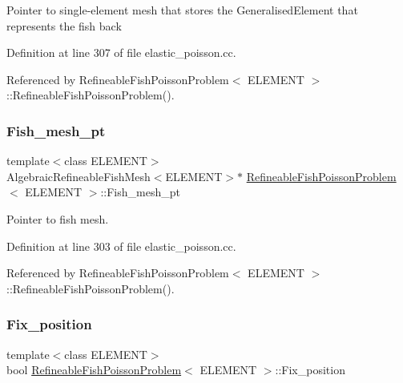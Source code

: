 Pointer to single-\/element mesh that stores the Generalised\+Element that represents the fish back 

Definition at line 307 of file elastic\+\_\+poisson.\+cc.



Referenced by Refineable\+Fish\+Poisson\+Problem$<$ E\+L\+E\+M\+E\+N\+T $>$\+::\+Refineable\+Fish\+Poisson\+Problem().

\mbox{\label{classRefineableFishPoissonProblem_af915f09b6e4ae2f4ded2ad1a25ed7f01}} 
\subsubsection{\texorpdfstring{Fish\+\_\+mesh\+\_\+pt}{Fish\_mesh\_pt}}
{\footnotesize\ttfamily template$<$class E\+L\+E\+M\+E\+NT$>$ \\
Algebraic\+Refineable\+Fish\+Mesh$<$E\+L\+E\+M\+E\+NT$>$$\ast$ \hyperlink{classRefineableFishPoissonProblem}{Refineable\+Fish\+Poisson\+Problem}$<$ E\+L\+E\+M\+E\+NT $>$\+::Fish\+\_\+mesh\+\_\+pt\hspace{0.3cm}{\ttfamily [private]}}



Pointer to fish mesh. 



Definition at line 303 of file elastic\+\_\+poisson.\+cc.



Referenced by Refineable\+Fish\+Poisson\+Problem$<$ E\+L\+E\+M\+E\+N\+T $>$\+::\+Refineable\+Fish\+Poisson\+Problem().

\mbox{\label{classRefineableFishPoissonProblem_a51c10ea7cbf4ab61fd953f011f72a1c4}} 
\subsubsection{\texorpdfstring{Fix\+\_\+position}{Fix\_position}}
{\footnotesize\ttfamily template$<$class E\+L\+E\+M\+E\+NT$>$ \\
bool \hyperlink{classRefineableFishPoissonProblem}{Refineable\+Fish\+Poisson\+Problem}$<$ E\+L\+E\+M\+E\+NT $>$\+::Fix\+\_\+position\hspace{0.3cm}{\ttfamily [private]}}



